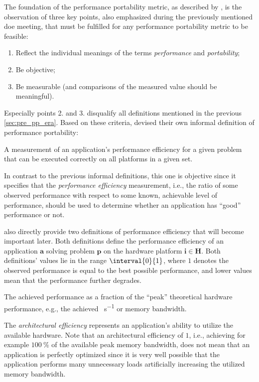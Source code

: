 The foundation of the performance portability metric, as described by \citeauthor{pennycook_implications_2019}, is the observation of three key points, also emphasized during the previously mentioned \gls{doe} meeting, that must be fulfilled for any performance portability metric to be feasible:
\begin{enumerate}
    \item Reflect the individual meanings of the terms \textit{performance} and \textit{portability};
    \item Be objective;
    \item Be measurable (and comparisons of the measured value should be meaningful).
\end{enumerate}
Especially points 2. and 3. disqualify all definitions mentioned in the previous \autoref{sec:pre_pp_era}.
Based on these criteria, \citeauthor{pennycook_implications_2019} devised their own informal definition of performance portability: 
\begin{quotebox}{\citet{pennycook_implications_2019}}
    A measurement of an application’s performance efficiency for a given problem that can be executed correctly on all platforms in a given set.
\end{quotebox}
In contrast to the previous informal definitions, this one is objective since it specifies that the \textit{performance efficiency} measurement, i.e., the ratio of some observed performance with respect to some known, achievable level of performance, should be used to determine whether an application has \enquote{good} performance or not. 

\citeauthor{pennycook_implications_2019} also directly provide two definitions of performance efficiency that will become important later. 
Both definitions define the performance efficiency of an application $\mathbf{a}$ solving problem $\mathbf{p}$ on the hardware platform $\mathbf{i \in H}$. 
Both definitions' values lie in the range $\interval{0}{1}$, where $1$ denotes the observed performance is equal to the best possible performance, and lower values mean that the performance further degrades. 

\begin{definition}\label{def:arch_eff}
    The achieved performance as a fraction of the \enquote{peak} theoretical hardware performance, e.g., the achieved \si{\flop\per\second} or memory bandwidth.
\end{definition}

The \textit{architectural efficiency} represents an application's ability to utilize the available hardware. 
Note that an architectural efficiency of $1$, i.e., achieving for example $\SI{100}{\percent}$ of the available peak memory bandwidth, does not mean that an application is perfectly optimized since it is very well possible that the application performs many unnecessary loads artificially increasing the utilized memory bandwidth. 

